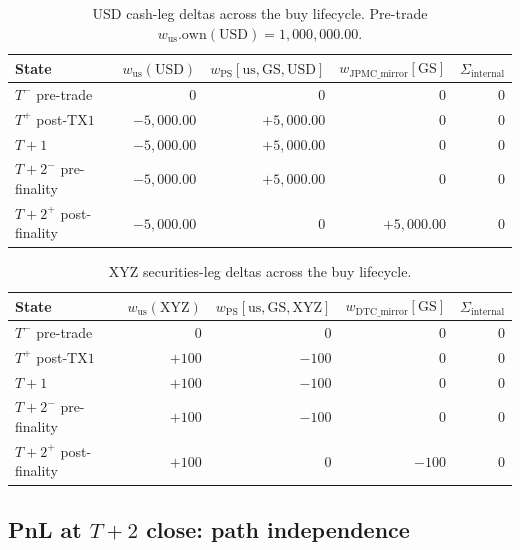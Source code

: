 \documentclass[11pt,a4paper]{article}
\begin{document}
\begin{table}[h]
\centering
\caption{USD cash-leg deltas across the buy lifecycle. Pre-trade $w_{\mathrm{us}}.\mathrm{own}(\mathrm{USD}) = 1{,}000{,}000.00$.}
\label{tab:buy-USD-deltas}
\begin{tabular}{lrrrr}
\toprule
\textbf{State} & $w_{\mathrm{us}}(\mathrm{USD})$ & $w_{\mathrm{PS}}[\mathrm{us,GS,USD}]$ & $w_{\mathrm{JPMC\_mirror}}[\mathrm{GS}]$ & $\Sigma_{\mathrm{internal}}$ \\
\midrule
$T^-$ pre-trade               & $0$           & $0$           & $0$           & $0$ \\
$T^+$ post-$\mathrm{TX1}$     & $-5{,}000.00$ & $+5{,}000.00$ & $0$           & $0$ \\
$T+1$                         & $-5{,}000.00$ & $+5{,}000.00$ & $0$           & $0$ \\
$T+2^-$ pre-finality          & $-5{,}000.00$ & $+5{,}000.00$ & $0$           & $0$ \\
$T+2^+$ post-finality         & $-5{,}000.00$ & $0$           & $+5{,}000.00$ & $0$ \\
\bottomrule
\end{tabular}
\end{table}

\begin{table}[h]
\centering
\caption{XYZ securities-leg deltas across the buy lifecycle.}
\label{tab:buy-XYZ-deltas}
\begin{tabular}{lrrrr}
\toprule
\textbf{State} & $w_{\mathrm{us}}(\mathrm{XYZ})$ & $w_{\mathrm{PS}}[\mathrm{us,GS,XYZ}]$ & $w_{\mathrm{DTC\_mirror}}[\mathrm{GS}]$ & $\Sigma_{\mathrm{internal}}$ \\
\midrule
$T^-$ pre-trade               & $0$    & $0$    & $0$    & $0$ \\
$T^+$ post-$\mathrm{TX1}$     & $+100$ & $-100$ & $0$    & $0$ \\
$T+1$                         & $+100$ & $-100$ & $0$    & $0$ \\
$T+2^-$ pre-finality          & $+100$ & $-100$ & $0$    & $0$ \\
$T+2^+$ post-finality         & $+100$ & $0$    & $-100$ & $0$ \\
\bottomrule
\end{tabular}
\end{table}

\subsection{PnL at $T+2$ close: path independence}
\end{document}
